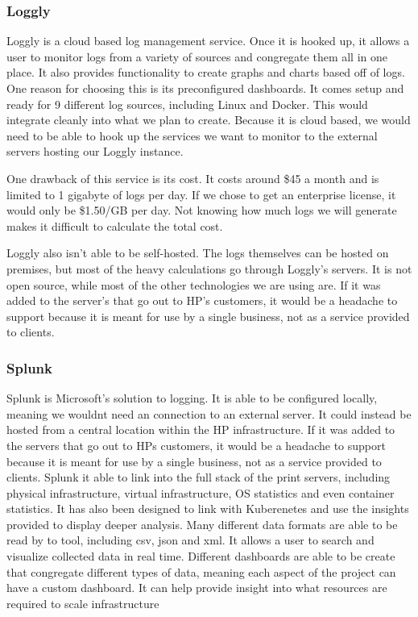 \documentclass[onecolumn, draftclsnofoot,10pt, compsoc]{IEEEtran}
\begin{document}
\subsubsection{Loggly}
Loggly is a cloud based log management service.
Once it is hooked up, it allows a user to monitor logs from a variety of sources and congregate them all in one place.
It also provides functionality to create graphs and charts based off of logs.
One reason for choosing this is its preconfigured dashboards.
It comes setup and ready for 9 different log sources, including Linux and Docker.
This would integrate cleanly into what we plan to create.
Because it is cloud based, we would need to be able to hook up the services we want to monitor to the external servers hosting our Loggly instance.

One drawback of this service is its cost.
It costs around \$45 a month and is limited to 1 gigabyte of logs per day.
If we chose to get an enterprise license, it would only be \$1.50/GB per day.
Not knowing how much logs we will generate makes it difficult to calculate the total cost.

Loggly also isn’t able to be self-hosted.
The logs themselves can be hosted on premises, but most of the heavy calculations go through Loggly’s servers.
It is not open source, while most of the other technologies we are using are.
If it was added to the server’s that go out to HP’s customers, it would be a headache to support because it is meant for use by a single business, not as a service provided to clients.

\subsubsection{Splunk}
Splunk is Microsoft’s solution to logging. It is able to be configured locally, meaning we wouldnt need an connection to an external server. It could instead be hosted from a central location within the HP infrastructure. If it was added to the servers that go out to HPs customers, it would be a headache to support because it is meant for use by a single business, not as a service provided to clients.
Splunk it able to link into the full stack of the print servers, including physical infrastructure, virtual infrastructure, OS statistics and even container statistics. It has also been designed to link with Kuberenetes and use the insights provided to display deeper analysis. Many different data formats are able to be read by to tool, including csv, json and xml.
It allows a user to search and visualize collected data in real time. Different dashboards are able to be create that congregate different types of data, meaning each aspect of the project can have a custom dashboard.
It can help provide insight into what resources are required to scale infrastructure
\end{document}
